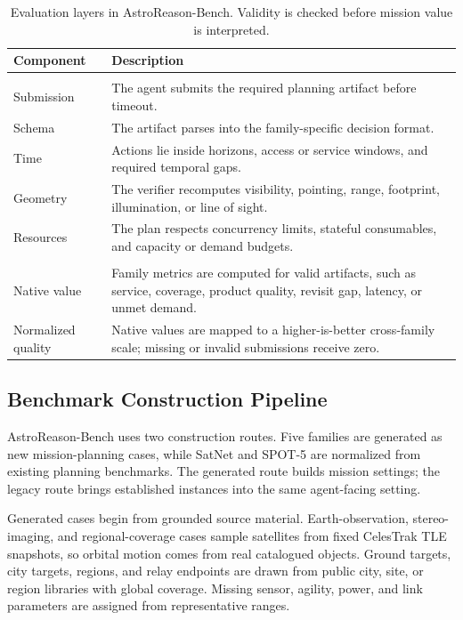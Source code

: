 \documentclass[11pt]{article}
\begin{document}
\begin{table}[t]
\centering
\small
\setlength{\tabcolsep}{5pt}
\begin{tabular}{>{\raggedright\arraybackslash}p{}>{\raggedright\arraybackslash}p{}}
\hline
\textbf{Component} & \textbf{Description} \\
\hline
\multicolumn{2}{c}{\cellcolor{gray!18}\textit{Validity}} \\
Submission & The agent submits the required planning artifact before timeout. \\
Schema & The artifact parses into the family-specific decision format. \\
Time & Actions lie inside horizons, access or service windows, and required temporal gaps. \\
Geometry & The verifier recomputes visibility, pointing, range, footprint, illumination, or line of sight. \\
Resources & The plan respects concurrency limits, stateful consumables, and capacity or demand budgets. \\
\hline
\multicolumn{2}{c}{\cellcolor{gray!18}\textit{Performance}} \\
Native value & Family metrics are computed for valid artifacts, such as service, coverage, product quality, revisit gap, latency, or unmet demand. \\
Normalized quality & Native values are mapped to a higher-is-better cross-family scale; missing or invalid submissions receive zero. \\
\hline
\end{tabular}
\caption{Evaluation layers in AstroReason-Bench. Validity is checked before mission value is interpreted.}
\label{tab:evaluation-layers}
\end{table}

\subsection{Benchmark Construction Pipeline}
\label{sec:construction-pipeline}

AstroReason-Bench uses two construction routes. Five families are generated as new mission-planning cases, while SatNet and SPOT-5 are normalized from existing planning benchmarks. The generated route builds mission settings; the legacy route brings established instances into the same agent-facing setting.

Generated cases begin from grounded source material. Earth-observation, stereo-imaging, and regional-coverage cases sample satellites from fixed CelesTrak TLE snapshots, so orbital motion comes from real catalogued objects. Ground targets, city targets, regions, and relay endpoints are drawn from public city, site, or region libraries with global coverage. Missing sensor, agility, power, and link parameters are assigned from representative ranges.
\end{document}
